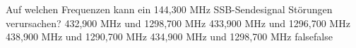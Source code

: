     {Auf welchen Frequenzen kann ein 144,300 MHz SSB-Sendesignal Störungen verursachen?}
    {432,900 MHz und 1298,700 MHz}
    {433,900 MHz und 1296,700 MHz}
    {438,900 MHz und 1290,700 MHz}
    {434,900 MHz und 1298,700 MHz}
    {false}{false}